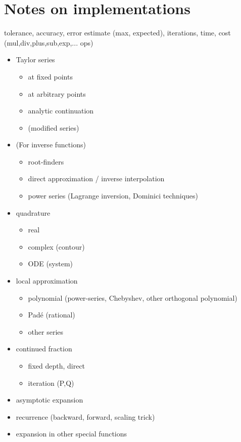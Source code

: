 \documentclass[10pt,dvipdfmx,letterpaper,twoside]{article}
\begin{document}
\section{Notes on implementations}
tolerance, accuracy, error estimate (max, expected), iterations, time, cost (mul,div,plus,sub,exp,... ops)
\begin{itemize}
\item Taylor series
  \begin{itemize}
  \item at fixed points
  \item at arbitrary points
  \item analytic continuation
  \item (modified series)
  \end{itemize}
\item (For inverse functions)
  \begin{itemize}
  \item root-finders
  \item direct approximation / inverse interpolation
  \item power series (Lagrange inversion, Dominici techniques)
  \end{itemize}
\item quadrature
  \begin{itemize}
  \item real
  \item complex (contour)
  \item ODE (system)
  \end{itemize}
\item local approximation
  \begin{itemize}
  \item polynomial (power-series, Chebyshev, other orthogonal polynomial)
  \item Pad\'e (rational)
  \item other series
  \end{itemize}
\item continued fraction
  \begin{itemize}
  \item fixed depth, direct
  \item iteration (P,Q)
  \end{itemize}
\item asymptotic expansion
\item recurrence (backward, forward, scaling trick)
\item expansion in other special functions
\end{itemize}
\end{document}
